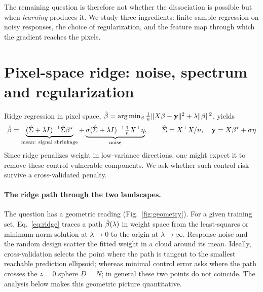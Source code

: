 The remaining question is therefore not whether the dissociation is possible but when \emph{learning} produces it. We study three ingredients: finite-sample regression on noisy responses, the choice of regularization, and the feature map through which the gradient reaches the pixels. %

\section{Pixel-space ridge: noise, spectrum and regularization}
\label{sec:pixel}

Ridge regression in pixel space, $\hat{\beta}=\arg\min_\beta\frac1n\|X\beta-\mathbf y\|^2+\lambda\|\beta\|^2$, yields
\begin{equation}
\hat{\beta}=\underbrace{(\hat\Sigma+\lambda I)^{-1}\hat\Sigma{\beta^{\star}}}_{\text{mean: signal shrinkage}}
+\underbrace{\sigma(\hat\Sigma+\lambda I)^{-1}\tfrac1nX^\top\eta}_{\text{noise}},
\qquad \hat\Sigma=X^\top X/n,
\quad
\mathbf y=X{\beta^{\star}}+\sigma \eta
\label{eq:ridge}
\end{equation}
Since ridge penalizes weight in low-variance directions, one might expect it to remove these control-vulnerable components. We ask whether such control risk survive a cross-validated penalty.

\paragraph{The ridge path through the two landscapes.}
The question has a geometric reading (Fig.~\ref{fig:geometry}). For a given training set, Eq.~\ref{eq:ridge} traces a path $\hat{\beta}(\lambda)$ in weight space from the least-squares or minimum-norm solution at $\lambda\to0$ to the origin at $\lambda\to\infty$. Response noise and the random design scatter the fitted weight in a cloud around its mean. Ideally, cross-validation selects the point where the path is tangent to the smallest reachable prediction ellipsoid; whereas minimal control error asks where the path crosses the $z=0$ sphere $D=N$; in general these two points do not coincide. The analysis below makes this geometric picture quantitative.


